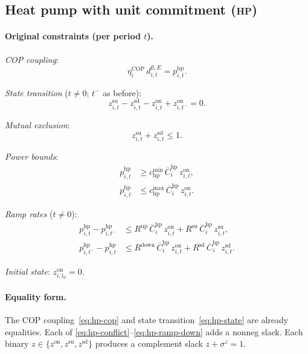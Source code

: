 \documentclass[11pt]{article}
\theoremstyle{definition}
\begin{document}
\subsection{Heat pump with unit commitment (\textsc{hp})}
\label{sec:hp}

\paragraph{Original constraints (per period $t$).}

\emph{COP coupling}:
\begin{equation}
\eta^{\mathrm{COP}}_i\,d^{\mathrm{fl},E}_{i,t}=p^{\mathrm{hp}}_{i,t}.
\label{eq:hp-cop}
\end{equation}

\emph{State transition} ($t\neq0$; $t^{-}$ as before):
\begin{equation}
z^{\mathrm{su}}_{i,t}-z^{\mathrm{sd}}_{i,t}
  -z^{\mathrm{on}}_{i,t}+z^{\mathrm{on}}_{i,t^{-}}=0.
\label{eq:hp-state}
\end{equation}

\emph{Mutual exclusion}:
\begin{equation}
z^{\mathrm{su}}_{i,t}+z^{\mathrm{sd}}_{i,t}\le1.
\label{eq:hp-conflict}
\end{equation}

\emph{Power bounds}:
\begin{align}
p^{\mathrm{hp}}_{i,t}&\ge c^{\min}_{\mathrm{hp}}\,
  \overline{C}^{\mathrm{hp}}_i\,z^{\mathrm{on}}_{i,t},
\label{eq:hp-min}\\
p^{\mathrm{hp}}_{i,t}&\le c^{\max}_{\mathrm{hp}}\,
  \overline{C}^{\mathrm{hp}}_i\,z^{\mathrm{on}}_{i,t}.
\label{eq:hp-max}
\end{align}

\emph{Ramp rates} ($t\neq0$):
\begin{align}
p^{\mathrm{hp}}_{i,t}-p^{\mathrm{hp}}_{i,t^{-}}
  &\le R^{\mathrm{up}}\,\overline{C}^{\mathrm{hp}}_i\,z^{\mathrm{on}}_{i,t}
  +R^{\mathrm{su}}\,\overline{C}^{\mathrm{hp}}_i\,z^{\mathrm{su}}_{i,t},
\label{eq:hp-ramp-up}\\
p^{\mathrm{hp}}_{i,t^{-}}-p^{\mathrm{hp}}_{i,t}
  &\le R^{\mathrm{down}}\,\overline{C}^{\mathrm{hp}}_i\,z^{\mathrm{on}}_{i,t}
  +R^{\mathrm{sd}}\,\overline{C}^{\mathrm{hp}}_i\,z^{\mathrm{sd}}_{i,t}.
\label{eq:hp-ramp-down}
\end{align}

\emph{Initial state}: $z^{\mathrm{on}}_{i,t_0}=0$.

\paragraph{Equality form.}
The COP coupling~\eqref{eq:hp-cop} and state
transition~\eqref{eq:hp-state} are already equalities.  Each of
\eqref{eq:hp-conflict}--\eqref{eq:hp-ramp-down} adds a nonneg slack.
Each binary
$z\in\{z^{\mathrm{on}},z^{\mathrm{su}},z^{\mathrm{sd}}\}$ produces a
complement slack $z+\sigma^z=1$.
\end{document}
